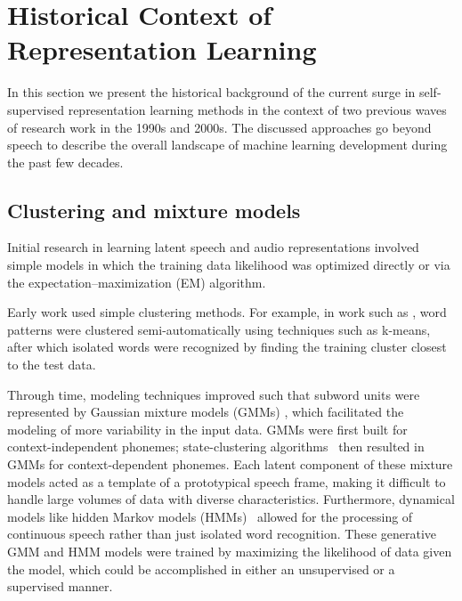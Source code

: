 
\section{Historical Context of Representation Learning}

\label{sec:thirdwave}

In this section we present the historical background of the current surge in
self-supervised representation learning methods in the context of two previous
waves of research work in the 1990s and 2000s. The discussed approaches go
beyond speech to describe the overall landscape of machine learning development during the
past few decades.

\subsection{Clustering and mixture models}

Initial research in learning latent speech and audio representations involved
simple models in which the training data likelihood was optimized directly
or via the expectation--maximization (EM) algorithm.

Early work used simple clustering methods. For example, in work such
as \cite{rabiner_considerations_1979,wilpon_modified_1985}, word patterns were clustered
semi-automatically using techniques such as k-means, after which isolated words
were recognized by finding the training cluster closest to 
  the test data.

Through time, modeling techniques improved such that subword units were
represented by Gaussian mixture models (GMMs) \cite{gauvain_maximum_1994}, which facilitated
the modeling of more variability in the input data. GMMs were first built for
context-independent phonemes; state-clustering 
algorithms~\cite{young_state_1994} then resulted in GMMs for context-dependent phonemes. 
Each latent component of these mixture models acted as a template of a
prototypical speech frame, 
making it difficult to handle 
large volumes of data with diverse characteristics. 
Furthermore, dynamical models like hidden Markov models (HMMs)~\cite{bell_adaptation_2021}
allowed for the processing of continuous speech rather than just isolated word
recognition. These generative GMM and HMM models were trained by maximizing the
likelihood of data given the model, which could be accomplished in either an
unsupervised or a supervised manner.

